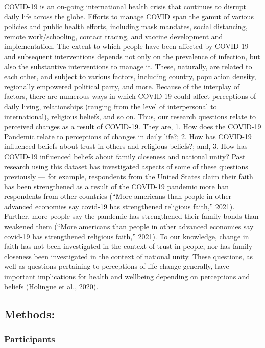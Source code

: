 \documentclass[
  english,
  man]{apa6}
\begin{document}
COVID-19 is an on-going international health crisis that continues to disrupt daily life across the globe. Efforts to manage COVID span the gamut of various policies and public health efforts, including mask mandates, social distancing, remote work/schooling, contact tracing, and vaccine development and implementation. The extent to which people have been affected by COVID-19 and subsequent interventions depends not only on the prevalence of infection, but also the substantive interventions to manage it. These, naturally, are related to each other, and subject to various factors, including country, population density, regionally empowered political party, and more. Because of the interplay of factors, there are numerous ways in which COVID-19 could affect perceptions of daily living, relationships (ranging from the level of interpersonal to international), religious beliefs, and so on. Thus, our research questions relate to perceived changes as a result of COVID-19. They are,
1. How does the COVID-19 Pandemic relate to perceptions of changes in daily life?;
2. How has COVID-19 influenced beliefs about trust in others and religious beliefs?; and,
3. How has COVID-19 influenced beliefs about family closeness and national unity?
Past research using this dataset has investigated aspects of some of these questions previously --- for example, respondents from the United States claim their faith has been strengthened as a result of the COVID-19 pandemic more han respondents from other countries (``More americans than people in other advanced economies say covid-19 has strengthened religious faith,'' 2021). Further, more people say the pandemic has strengthened their family bonds than weakened them (``More americans than people in other advanced economies say covid-19 has strengthened religious faith,'' 2021). To our knowledge, change in faith has not been investigated in the context of trust in people, nor has family closeness been investigated in the context of national unity. These questions, as well as questions pertaining to perceptions of life change generally, have important implications for health and wellbeing depending on perceptions and beliefs (Holingue et al., 2020).

\hypertarget{methods}{%
\subsection{Methods:}\label{methods}}

\hypertarget{participants}{%
\subsubsection{Participants}\label{participants}}
\end{document}
